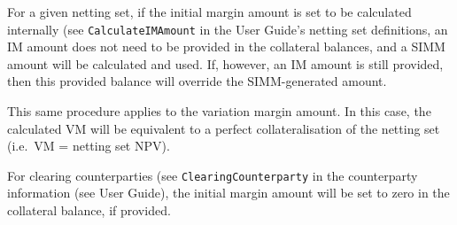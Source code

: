 {\vspace{1em}

For a given netting set, if the initial margin amount is set to be calculated internally (see
\lstinline!CalculateIMAmount! in the User Guide's netting set definitions, an IM
amount does not need to be provided in the collateral balances, and a SIMM amount will be
calculated and used. If, however,
an IM amount is still provided, then this provided balance will override the SIMM-generated amount.

This same procedure applies to the variation margin amount. In this case, the calculated VM will be
equivalent to a perfect collateralisation of the netting set (i.e.\ VM = netting set NPV).

\vspace{1em}

For clearing counterparties (see \lstinline!ClearingCounterparty! in the counterparty information (see User Guide),
the initial margin amount will be set to zero in the collateral balance, if provided.
}\fi %

